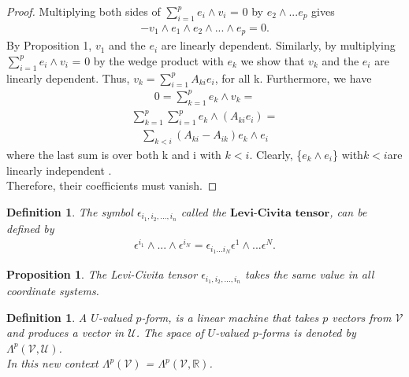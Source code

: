 \documentclass[12pt,a4paper]{article}
\newtheorem{defn}[thm]{Definition}
\newtheorem{prop}{Proposition}
\begin{document}
\begin{proof}
Multiplying both sides of $\sum^{p}_{i=1} e_i \wedge v_i$ = 0 by $e_2 \wedge ... e_p$ gives
\begin{align*}
-v_1 \wedge e_1 \wedge e_2 \wedge ... \wedge e_p = 0.
\end{align*}
By Proposition 1, $v_1$ and the $e_i$ are linearly dependent. Similarly, by
multiplying $\sum^{p}_{i=1} e_i \wedge v_i$ = 0 by the wedge product with $e_k$  we
show that $v_k$ and  the $e_i$ are linearly dependent. Thus, $v_k = \sum^p_{i=1} A_{ki} e_i$, for all k. Furthermore, we have\\
\begin{align*}
 0 = \sum^{p}_{k=1} e_k \wedge v_k  = 
 \end{align*}
 \begin{align*}
 \sum^{p}_{k=1} \sum^{p}_{i=1} e_k \wedge ( A_{ki} e_i) = 
 \end{align*}
 \begin{align*}
 \sum_{k<i} (A_{ki} - A_{ik}) e_k \wedge e_i
\end{align*}
where the last sum is over both k and i with $k < i$. Clearly, \{$e_k \wedge e_i$\} with$ k <
i $are linearly independent .\\ Therefore, their coefficients must
vanish.
\end{proof}
\begin{defn}
The symbol $\epsilon_{i_1, i_2, ... , i_n}$ called the $\textbf{Levi-Civita tensor}$, can be defined by
\begin{eqnarray*}
\epsilon^{i_1} \wedge ... \wedge \epsilon^{i_N} = \epsilon_{i_1 ... i_N} \epsilon^1 \wedge ... \epsilon^N.
\end{eqnarray*}
\end{defn}
\begin{prop}
The Levi-Civita tensor $\epsilon_{i_1, i_2, ... , i_n}$ takes the same value in
all coordinate systems.
\end{prop}
\begin{defn}
A $U$-valued $p$-form, is a linear machine that takes $p$
vectors from $\mathcal{V}$ and produces a vector in $\mathcal{U}$. The space of $U$-valued $p$-forms
is denoted by $\Lambda^{p}(\mathcal{V}, \mathcal{U})$. \\ In this new context $\Lambda^{p}(\mathcal{V})$ =  $\Lambda^{p}(\mathcal{V}, \mathbb{R})$.
\end{defn}
\end{document}
